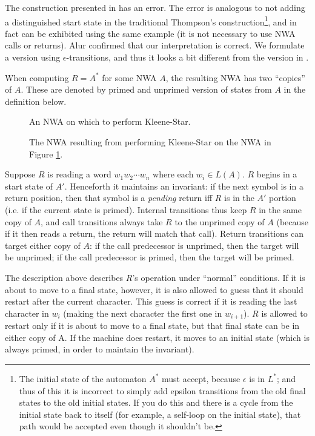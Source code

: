 The construction presented in \cite{JACM:AM2009} has an error. The error is
analogous to not adding a distinguished start state in the traditional
Thompson's construction\footnote{The initial state of the automaton $A^*$
  must accept, because $\epsilon$ is in $L^*$; and thus of this it is
  incorrect to simply add epsilon transitions from the old final states to
  the old initial states. If you do this and there is a cycle from the
  initial state back to itself (for example, a self-loop on the initial
  state), that path would be accepted even though it shouldn't be.}, and in
fact can be exhibited using the same example (it is not necessary to use NWA
calls or returns). Alur confirmed that our interpretation is correct. We
formulate a version using $\epsilon$-transitions, and thus it looks a bit
different from the version in \cite{JACM:AM2009}.

When computing $R = A^*$ for some
NWA $A$, the resulting NWA has two ``copies'' of $A$. These are denoted by
primed and unprimed version of states from $A$ in the definition below. 

\begin{figure}[p]
  \centering
  \caption{An NWA on which to perform Kleene-Star.}
  \label{Fi:Star1}
\end{figure}

\begin{figure}[p]
  \centering
  \caption{The NWA resulting from performing Kleene-Star on the NWA in Figure \ref{Fi:Star1}.}
  \label{Fi:Star2}
\end{figure}
\antistupidfloats


Suppose $R$ is reading a word $w_1w_2\cdots w_n$ where each $w_i \in
L(A)$. $R$ begins in a start state of $A'$. Henceforth it maintains an
invariant: if the next symbol is in a return position, then that symbol is a
\emph{pending} return iff $R$ is in the $A'$ portion (i.e. if the current state is
primed). Internal transitions thus keep $R$ in the same copy of $A$, and call
transitions always take $R$ to the unprimed copy of $A$ (because if it then
reads a return, the return will match that call). Return transitions can
target either copy of $A$: if the call predecessor is unprimed, then the
target will be unprimed; if the call predecessor is primed, then the target
will be primed.

The description above describes $R$'s operation under ``normal''
conditions. If it is about to move to a final state, however, it is also allowed to guess that it
should restart after the current character. This guess is correct if it is
reading the last character in $w_i$
(making the next character the first one in $w_{i+1}$). $R$ is allowed to
restart only if it is about to move to a final state, but that final state
can be in either copy of A. If the machine
does restart, it moves to an initial state (which is always primed, in order to
maintain the invariant).

